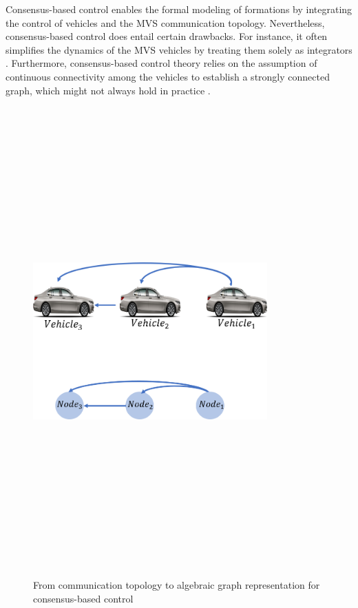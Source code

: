 Consensus-based control enables the formal modeling of formations by integrating the control of vehicles and the MVS communication topology. Nevertheless, consensus-based control does entail certain drawbacks. For instance, it often simplifies the dynamics of the MVS vehicles by treating them solely as integrators \cite{ren2008distributed}. Furthermore, consensus-based control theory relies on the assumption of continuous connectivity among the vehicles to establish a strongly connected graph, which might not always hold in practice \cite{wang2022consensus}. 







\begin{figure}[!h]
        \centering 
        \includegraphics[width=9cm,height=18cm,keepaspectratio]{chapters/Chapitre_3/Figures/Consensus_control.png}
        \caption{From communication topology to algebraic graph representation for consensus-based control}
        \label{fig:consensus_control}
        \end{figure}


